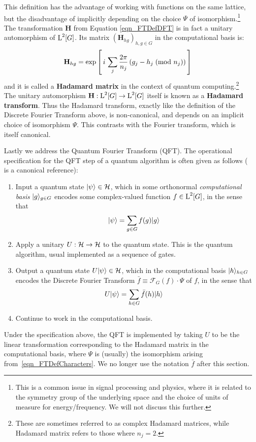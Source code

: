 This definition has the advantage of working with functions on the same lattice, but the disadvantage of implicitly depending on the choice $\Psi$ of isomorphism.\footnote{This is a common issue in signal processing and physics, where it is related to the symmetry group of the underlying space and the choice of units of measure for energy/frequency. We will not discuss this further.} The transformation $\mathbf{H}$ from Equation \ref{eqn_FTDefDFT} is in fact a unitary automorphism of $\operatorname{L}^2[G]$. Its matrix $(\mathbf{H}_{hg})_{h,g \in G}$ in the computational basis is:
\begin{equation} \label{eqn_HadamardMatrixDef}
  \mathbf{H}_{hg} = \exp\left[\, i \, \sum_j \frac{2 \pi}{n_j} \left(\modclass{g_j-h_j}{n_j}\right) \, \right] %
\end{equation}
and it is called a \textbf{Hadamard matrix} in the context of quantum computing.\footnote{These are sometimes referred to as complex Hadamard matrices, while Hadamard matrix refers to those where $n_j=2$.} The unitary automorphism $\mathbf{H}:\operatorname{L}^2[G] \rightarrow \operatorname{L}^2[G]$ itself is known as a \textbf{Hadamard transform}. Thus the Hadamard transform, exactly like the definition of the Discrete Fourier Transform above, is non-canonical, and depends on an implicit choice of isomorphism $\Psi$. This contrasts with the Fourier transform, which is itself canonical.

Lastly we address the Quantum Fourier Transform (QFT). The operational specification for the QFT step of a quantum algorithm is often given as follows (\cite{nielsen2010quantum} is a canonical reference):
\begin{enumerate}
  \item[1.] Input a quantum state $| \psi \rangle \in \mathcal{H}$, which in some orthonormal \textit{computational basis} $| g \rangle_{g\in G}$ encodes some complex-valued function $f \in \operatorname{L}^2[G]$, in the sense that 
    \begin{equation*}
      | \psi \rangle = \sum_{g\in G} f(g) | g \rangle
    \end{equation*}
  \item[2.] Apply a unitary $U : \mathcal{H} \rightarrow \mathcal{H}$ to the quantum state. This is the quantum algorithm, usual implemented as a sequence of gates.
  \item[3.] Output a quantum state $U| \psi \rangle \in \mathcal{H}$, which in the computational basis $| h \rangle_{h\in G}$ encodes the Discrete Fourier Transform $\bar{f} \equiv \mathcal{F}_G(f) \cdot \Psi$ of $f$, in the sense that 
    \begin{equation*}
      U | \psi \rangle = \sum_{h\in G} \bar{f}(h)| h \rangle
    \end{equation*}
  \item[4.] Continue to work in the computational basis.
\end{enumerate}
Under the specification above, the QFT is implemented by taking $U$ to be the linear transformation corresponding to the Hadamard matrix in the computational basis, where $\Psi$ is (usually) the isomorphism arising from~\eqref{eqn_FTDefCharacters}. We no longer use the notation $\bar{f}$ after this section.

